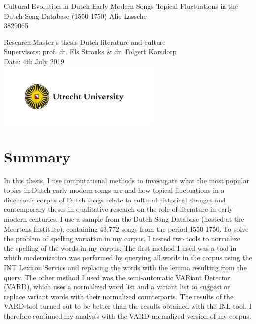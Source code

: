 \documentclass[a4paper,12pt,openright,twoside,unknownkeysallowed]{book}
\begin{document}
	\thispagestyle{empty}
	\newpage
	\vskip10cm
	\begin{center}
		\huge{Cultural Evolution in Dutch Early Modern Songs}
		\vskip2mm
		\LARGE{Topical Fluctuations in the Dutch Song Database (1550-1750)}
		\vskip10mm
		\Large{Alie Lassche}\\
		\vskip2mm
		\normalsize{3829065}

		\normalsize
	\end{center}
	\vskip95mm
	\begin{center}
		\normalsize
		Research Master's thesis Dutch literature and culture\\
		Supervisors: prof. dr. Els Stronks \& dr. Folgert Karsdorp\\
		Date: 4th July 2019\\
		\includegraphics[width=8cm]{images/UUlogo}
	\end{center}
\chapter*{Summary}
In this thesis, I use computational methods to investigate what the most popular topics in Dutch early modern songs are and how topical fluctuations in a diachronic corpus of Dutch songs relate to cultural-historical changes and contemporary theses in qualitative research on the role of literature in early modern centuries. I use a sample from the Dutch Song Database (hosted at the Meertens Institute), containing 43,772 songs from the period 1550-1750. To solve the problem of spelling variation in my corpus, I tested two tools to normalize the spelling of the words in my corpus. The first method I used was a tool in which modernization was performed by querying all words in the corpus using the INT Lexicon Service and replacing the words with the lemma resulting from the query. The other method I used was the semi-automatic VARiant Detector (VARD), which uses a normalized word list and a variant list to suggest or replace variant words with their normalized counterparts. The results of the VARD-tool turned out to be better than the results obtained with the INL-tool. I therefore continued my analysis with the VARD-normalized version of my corpus.
\end{document}
